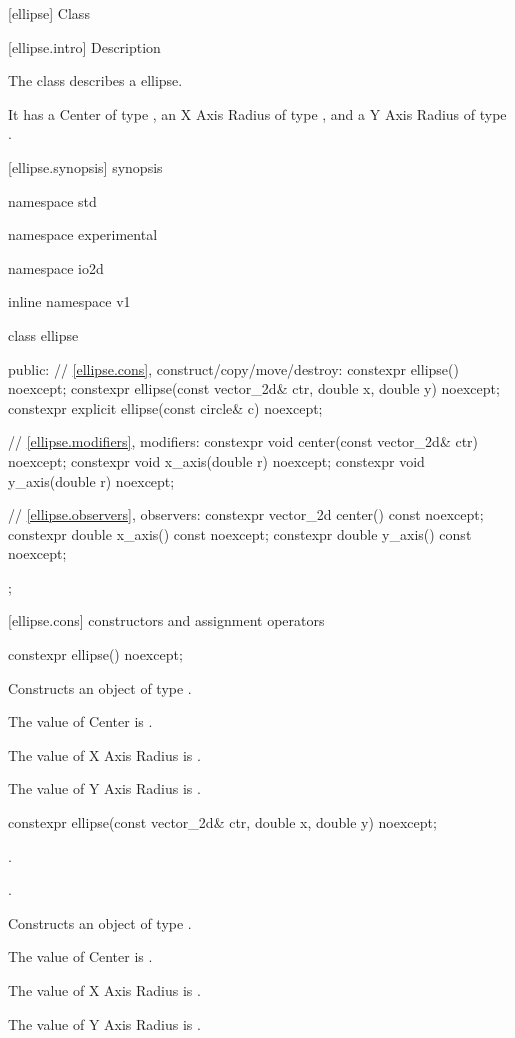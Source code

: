  [ellipse] {Class }

 [ellipse.intro] { Description}

\pnum
{}
The class  describes a ellipse.

\pnum
It has a Center of type , an X Axis Radius of type , and a Y Axis Radius of type .

 [ellipse.synopsis] { synopsis}

\begin{codeblock}
namespace std { namespace experimental { namespace io2d { inline namespace v1 {
  class ellipse {
  public:
    // \ref{ellipse.cons}, construct/copy/move/destroy:
    constexpr ellipse() noexcept;
    constexpr ellipse(const vector_2d& ctr, double x, double y) noexcept;
    constexpr explicit ellipse(const circle& c) noexcept;

    // \ref{ellipse.modifiers}, modifiers:
    constexpr void center(const vector_2d& ctr) noexcept;
    constexpr void x_axis(double r) noexcept;
    constexpr void y_axis(double r) noexcept;
    
    // \ref{ellipse.observers}, observers:
    constexpr vector_2d center() const noexcept;
    constexpr double x_axis() const noexcept;
    constexpr double y_axis() const noexcept;
  };
} } } }
\end{codeblock}

 [ellipse.cons] { constructors and assignment operators}

\begin{itemdecl}
constexpr ellipse() noexcept;
\end{itemdecl}
\begin{itemdescr}
\pnum
\effects
Constructs an object of type .

\pnum
The value of Center is .

\pnum
The value of X Axis Radius is .

\pnum
The value of Y Axis Radius is .
\end{itemdescr}

\begin{itemdecl}
constexpr ellipse(const vector_2d& ctr, double x, double y) noexcept;
\end{itemdecl}
\begin{itemdescr}
\pnum
\preconditions
{}.

\pnum
{}.

\pnum
\effects
Constructs an object of type .

\pnum
The value of Center is .

\pnum
The value of X Axis Radius is .

\pnum
The value of Y Axis Radius is .
\end{itemdescr}

